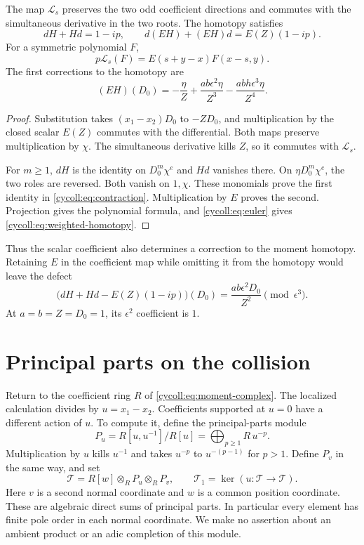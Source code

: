 \begin{proposition}\label{cycoll:prop:lift}
The map $\mathcal L_s$ preserves the two odd coefficient
directions and commutes with the simultaneous derivative in
the two roots. The homotopy satisfies
\begin{equation}\label{cycoll:eq:contraction}
 dH+Hd=1-ip,\qquad
 d(EH)+(EH)d=E(Z)(1-ip).
\end{equation}
For a symmetric polynomial $F$,
\[
 p\mathcal L_s(F)=E(s+y-x)F(x-s,y).
\]
The first corrections to the homotopy are
\begin{equation}\label{cycoll:eq:weighted-homotopy}
 (EH)(D_0)=-\frac{\eta}{Z}
          +\frac{ab\epsilon^2\eta}{Z^3}
          -\frac{abh\epsilon^3\eta}{Z^4}.
\end{equation}
\end{proposition}
\begin{proof}
Substitution takes $(x_1-x_2)D_0$ to $-ZD_0$, and multiplication
by the closed scalar $E(Z)$ commutes with the differential.
Both maps preserve multiplication by $\chi$. The simultaneous
derivative kills $Z$, so it commutes with $\mathcal L_s$.

For $m\geq1$, $dH$ is the identity on $D_0^m\chi^e$ and
$Hd$ vanishes there. On $\eta D_0^m\chi^e$, the two roles
are reversed. Both vanish on $1,\chi$. These monomials prove
the first identity in \eqref{cycoll:eq:contraction}.
Multiplication by $E$ proves the second. Projection gives the
polynomial formula, and \eqref{cycoll:eq:euler} gives
\eqref{cycoll:eq:weighted-homotopy}.
\end{proof}

Thus the scalar coefficient also determines a correction to the
moment homotopy. Retaining $E$ in the coefficient map while
omitting it from the homotopy would leave the defect
\begin{equation}\label{cycoll:eq:euler-defect}
 \bigl(dH+Hd-E(Z)(1-ip)\bigr)(D_0)
   =\frac{ab\epsilon^2D_0}{Z^2}\pmod{\epsilon^3}.
\end{equation}
At $a=b=Z=D_0=1$, its $\epsilon^2$ coefficient is $1$.

\section{Principal parts on the collision}
\label{cycoll:sec:supported}

Return to the coefficient ring $R$ of
\eqref{cycoll:eq:moment-complex}. The localized calculation
divides by $u=x_1-x_2$. Coefficients
supported at $u=0$ have a different action of $u$. To compute it,
define the principal-parts module
\[
 P_u=R[u,u^{-1}]/R[u]
     =\bigoplus_{p\geq1}R\,u^{-p}.
\]
Multiplication by $u$ kills $u^{-1}$ and takes $u^{-p}$ to
$u^{-(p-1)}$ for $p>1$. Define $P_v$ in the same way, and set
\[
 \mathcal T=R[w]\otimes_R P_u\otimes_R P_v,
 \qquad \mathcal T_1=\ker(u:\mathcal T\to\mathcal T).
\]
Here $v$ is a second normal coordinate and $w$ is a common
position coordinate. These are algebraic direct sums of
principal parts. In particular every element has finite pole
order in each normal coordinate. We make no assertion about
an ambient product or an adic completion of this module.

